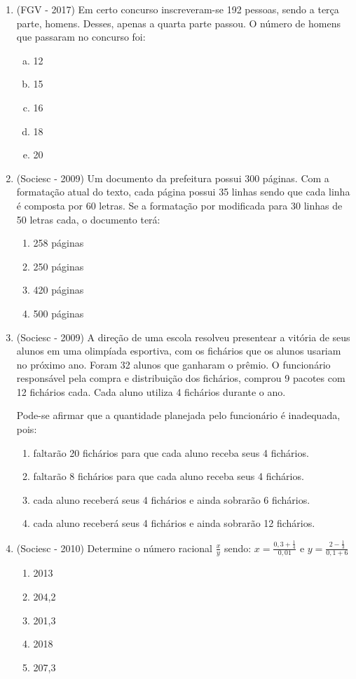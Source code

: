 \begin{enumerate}
  \item (FGV - 2017) Em certo concurso inscreveram-se 192 pessoas, sendo a terça parte, homens. Desses, apenas a quarta parte passou. O número de homens que passaram no concurso foi: 
  \begin{enumerate}[a)]
  \item 12
  \item 15
  \item 16
  \item 18
  \item 20
  \end{enumerate}
  
   \item (Sociesc - 2009) Um documento da prefeitura possui 300 páginas. Com a formatação atual do texto, cada página possui 35 linhas sendo que cada linha é composta por 60 letras. Se a formatação por modificada para 30 linhas de 50 letras cada, o documento terá:
 \begin{enumerate}
  \item 258 páginas
  \item 250 páginas
  \item 420 páginas
  \item 500 páginas
 \end{enumerate}
 
 \item (Sociesc - 2009) A direção de uma escola resolveu presentear a vitória de seus alunos em uma olimpíada esportiva, com os fichários que os alunos usariam no próximo ano. Foram 32 alunos que ganharam o
 prêmio. O funcionário responsável pela compra e distribuição dos fichários, comprou 9 pacotes com 12 fichários cada. Cada aluno utiliza 4 fichários durante o ano.

 Pode-se afirmar que a quantidade planejada pelo funcionário é inadequada, pois:
 \begin{enumerate}
  \item faltarão 20 fichários para que cada aluno receba seus 4 fichários.
  \item faltarão 8 fichários para que cada aluno receba seus 4 fichários.
  \item cada aluno receberá seus 4 fichários e ainda sobrarão 6 fichários.
  \item cada aluno receberá seus 4 fichários e ainda sobrarão 12 fichários.
 \end{enumerate}
 
 \item (Sociesc - 2010) Determine o número racional $\frac{x}{y}$ sendo:
  $x=\frac{0,3 + \frac{1}{4}}{0,01}$ e $y=\frac{2-\frac{1}{3}}{0,1+6}$
  \begin{enumerate}
  \item 2013
  \item 204,2
  \item 201,3
  \item 2018
  \item 207,3
 \end{enumerate}
 

\end{enumerate}
